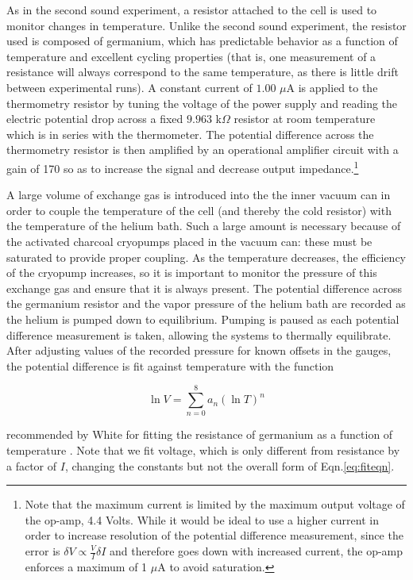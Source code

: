 As in the second sound experiment, a resistor attached to the cell is
used to monitor changes in temperature. Unlike the second sound
experiment, the resistor used is composed of germanium, which has
predictable behavior as a function of temperature and excellent
cycling properties (that is, one measurement of a resistance will
always correspond to the same temperature, as there is little drift
between experimental runs). A constant current of $1.00$ $\mu$A is
applied to the thermometry resistor by tuning the voltage of the power
supply and reading the electric potential drop across a fixed $9.963$
k$\Omega$ resistor at room temperature which is in series with the
thermometer. The potential difference across the thermometry resistor
is then amplified by an operational amplifier circuit with a gain of
170 so as to increase the signal and decrease output impedance.\footnote{Note that the maximum current is limited by the maximum
  output voltage of the op-amp, 4.4 Volts. While it would be ideal to
  use a higher current in order to increase resolution of the
  potential difference measurement, since the error is $\delta V
  \propto \frac{V}{I} \delta I$ and therefore goes down with increased
  current, the op-amp enforces a maximum of 1 $\mu$A to avoid
  saturation.}

A large volume of exchange gas is introduced into the the inner vacuum
can in order to couple the temperature of the cell (and thereby the
cold resistor) with the temperature of the helium bath. Such a large
amount is necessary because of the activated charcoal cryopumps
placed in the vacuum can: these must be saturated to provide proper
coupling. As the temperature decreases, the efficiency of the cryopump
increases, so it is important to monitor the pressure of this exchange
gas and ensure that it is always present. The potential difference
across the germanium resistor and the vapor pressure of the helium
bath are recorded as the helium is pumped down to equilibrium. Pumping
is paused as each potential difference measurement is taken, allowing
the systems to thermally equilibrate. After adjusting values of the
recorded pressure for known offsets in the gauges, the potential
difference is fit against temperature with the function

\begin{equation}
\label{eq:fiteqn}
\ln{V} = \sum_{n=0}^{8} a_{n} (\ln{T})^{n}
\end{equation}

recommended by White for fitting the resistance of germanium as a
function of temperature \cite{white}. Note that we fit voltage, which
is only different from resistance by a factor of $I$, changing the
constants but not the overall form of Eqn.\ref{eq:fiteqn}.

